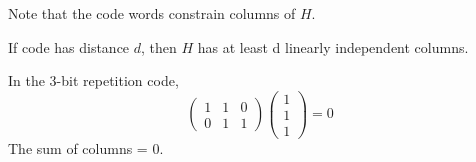 Note that the code words constrain columns of $H$. 
\begin{lemma}
    If code has distance $d$, then $H$ has at least d linearly independent columns. 
\end{lemma}
In the 3-bit repetition code, 
\begin{equation}
\begin{pmatrix}
    1 & 1 & 0 \\ 0 & 1 & 1
\end{pmatrix} \begin{pmatrix}
    1 \\ 1 \\ 1
\end{pmatrix} = 0
\end{equation}
The sum of columns = 0. \\
\begin{equation}
\end{equation}

